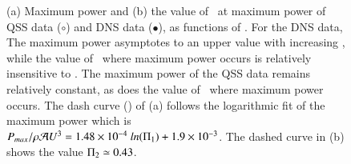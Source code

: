 \begin{figure}
    \caption{(a) Maximum power and (b) the value of \massdamp\ at
      maximum power of QSS data ($\circ$) and DNS data ($\bullet$), as
      functions of \massstiff.  For the DNS data, The maximum power
      asymptotes to an upper value with increasing \massstiff, while
      the value of \massdamp\ where maximum power occurs is relatively
      insensitive to \massstiff. The maximum power of the QSS data
      remains relatively constant, as does the value of \massdamp\
      where maximum power occurs. The dash curve (\protect\dashedrule)
      of (a) follows the logarithmic fit of the maximum power which is
      $P_{max}/\rho \mathcal{A}U^3 =1.48 \times 10^{-4} \
      ln(\Pi_1) + 1.9 \times 10^{-3} $. The dashed curve in (b)
      shows the value $\Pi_2\simeq 0.43$.}

    \label{fig:max_power}
\end{figure}

